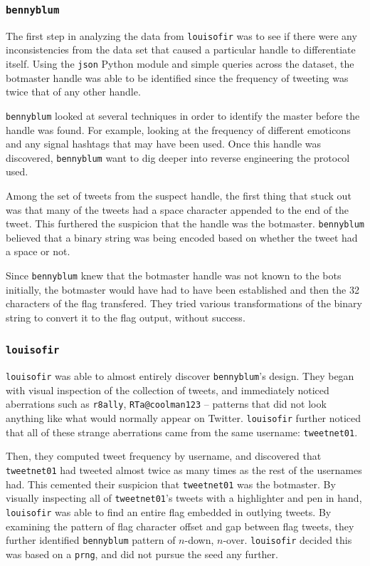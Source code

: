 \documentclass[11pt, oneside]{article} %
\numberwithin{equation}{section} %
\numberwithin{figure}{section} %
\numberwithin{table}{section} %
\renewcommand{\c}[1]{\texttt{#1}}
\newcommand{\code}[1]{\c{#1}}
\newcommand{\teambb}{\c{bennyblum}}
\newcommand{\teamol}{\c{louisofir}}
\begin{document}
		\subsubsection{\teambb{}}
			The first step in analyzing the data from \teamol{} was to see if there were any inconsistencies from the data set that caused a particular handle to differentiate itself. Using the \c{json} Python module and simple queries across the dataset, the botmaster handle was able to be identified since the frequency of tweeting was twice that of any other handle.

			\teambb{} looked at several techniques in order to identify the master before the handle was found. For example, looking at the frequency of different emoticons and any signal hashtags that may have been used. Once this handle was discovered, \teambb{} want to dig deeper into reverse engineering the protocol used.

			Among the set of tweets from the suspect handle, the first thing that stuck out was that many of the tweets had a space character appended to the end of the tweet. This furthered the suspicion that the handle was the botmaster. \teambb{} believed that a binary string was being encoded based on whether the tweet had a space or not.

			Since \teambb{} knew that the botmaster handle was not known to the bots initially, the botmaster would have had to have been established and then the 32 characters of the flag transfered. They tried various transformations of the binary string to convert it to the flag output, without success. 

		\subsubsection{\teamol{}}
	\teamol{} was able to almost entirely discover \teambb{}'s design. They began with visual inspection of the collection of tweets, and immediately noticed aberrations such as \code{r8ally}, \code{RTa@coolman123} -- patterns that did not look anything like what would normally appear on Twitter. \teamol{} further noticed that all of these strange aberrations came from the same username: \c{tweetnet01}.

	Then, they computed tweet frequency by username, and discovered that \code{tweetnet01} had tweeted almost twice as many times as the rest of the usernames had. This cemented their suspicion that \code{tweetnet01} was the botmaster. By visually inspecting all of \code{tweetnet01}'s tweets with a highlighter and pen in hand, \teamol{} was able to find an entire flag embedded in outlying tweets. By examining the pattern of flag character offset and gap between flag tweets, they further identified \teambb{} pattern of $n$-down, $n$-over. \teamol{} decided this was based on a \c{prng}, and did not pursue the seed any further.
\end{document}
